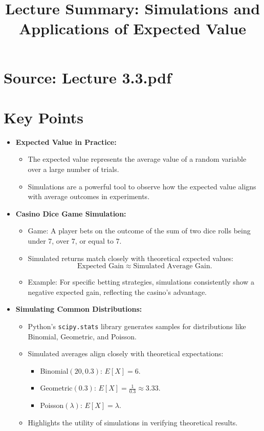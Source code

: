 \documentclass{article}
\title{Lecture Summary: Simulations and Applications of Expected Value}
\author{}
\date{}
\begin{document}
\maketitle

\section*{Source: Lecture 3.3.pdf}

\section*{Key Points}

\begin{itemize}
  \item \textbf{Expected Value in Practice:}
    \begin{itemize}
      \item The expected value represents the average value of a random variable over a large number of trials.
      \item Simulations are a powerful tool to observe how the expected value aligns with average outcomes in experiments.
    \end{itemize}

  \item \textbf{Casino Dice Game Simulation:}
    \begin{itemize}
      \item Game: A player bets on the outcome of the sum of two dice rolls being under 7, over 7, or equal to 7.
      \item Simulated returns match closely with theoretical expected values:
        \[
          \text{Expected Gain} \approx \text{Simulated Average Gain}.
        \]
      \item Example: For specific betting strategies, simulations consistently show a negative expected gain, reflecting the casino's advantage.
    \end{itemize}

  \item \textbf{Simulating Common Distributions:}
    \begin{itemize}
      \item Python's \texttt{scipy.stats} library generates samples for distributions like Binomial, Geometric, and Poisson.
      \item Simulated averages align closely with theoretical expectations:
        \begin{itemize}
          \item Binomial$(20, 0.3)$: $E[X] = 6$.
          \item Geometric$(0.3)$: $E[X] = \frac{1}{0.3} \approx 3.33$.
          \item Poisson$(\lambda)$: $E[X] = \lambda$.
        \end{itemize}
      \item Highlights the utility of simulations in verifying theoretical results.
    \end{itemize}


\end{itemize}
\end{document}

